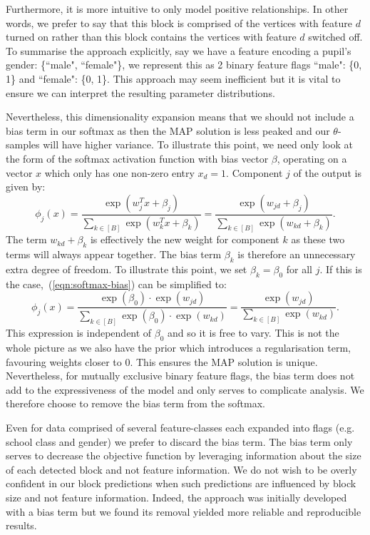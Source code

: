 Furthermore, it is more intuitive to only model positive relationships. In other words, we prefer to say that this block is comprised of the vertices with feature $d$ turned on rather than this block contains the vertices with feature $d$ switched off. To summarise the approach explicitly, say we have a feature encoding a pupil's gender: \{``male", ``female"\}, we represent this as 2 binary feature flags ``male": \{0, 1\} and ``female": \{0, 1\}. This approach may seem inefficient but it is vital to ensure we can interpret the resulting parameter distributions.

Nevertheless, this dimensionality expansion means that we should not include a bias term in our softmax as then the MAP solution is less peaked and our $\theta$-samples will have higher variance. To illustrate this point, we need only look at the form of the softmax activation function with bias vector $\beta$, operating on a vector $x$ which only has one non-zero entry $x_d=1$. Component $j$ of the output is given by:
%
\begin{equation}
	\phi_j(x) = \frac{\exp(w_j^T x + \beta_j)}{\sum_{k \in [B]} \exp(w_k^T x + \beta_k)} = 
	\frac{\exp(w_{jd} + \beta_j)}{\sum_{k \in [B]} \exp({w_{kd} + \beta_k})}.
	\label{eqn:softmax-bias}
\end{equation}
%
The term $w_{kd} + \beta_k$ is effectively the new weight for component $k$ as these two terms will always appear together. The bias term $\beta_k$ is therefore an unnecessary extra degree of freedom. To illustrate this point, we set $\beta_k=\beta_0$ for all $j$. If this is the case,~(\ref{eqn:softmax-bias}) can be simplified to:
%
\begin{equation}
	\phi_j(x) = \frac{\exp(\beta_0) \cdot \exp(w_{jd})}{\sum_{k \in [B]} \exp(\beta_0) \cdot \exp(w_{kd})}
	= \frac{\exp(w_{jd})}{\sum_{k \in [B]} \exp(w_{kd})}.
\end{equation}
%
This expression is independent of $\beta_0$ and so it is free to vary. This is not the whole picture as we also have the prior which introduces a regularisation term, favouring weights closer to 0. This ensures the MAP solution is unique. Nevertheless, for mutually exclusive binary feature flags, the bias term does not add to the expressiveness of the model and only serves to complicate analysis. We therefore choose to remove the bias term from the softmax.

Even for data comprised of several feature-classes each expanded into flags (e.g. school class and gender) we prefer to discard the bias term. The bias term only serves to decrease the objective function by leveraging information about the size of each detected block and not feature information. We do not wish to be overly confident in our block predictions when such predictions are influenced by block size and not feature information. Indeed, the approach was initially developed with a bias term but we found its removal yielded more reliable and reproducible results.
\clearpage

